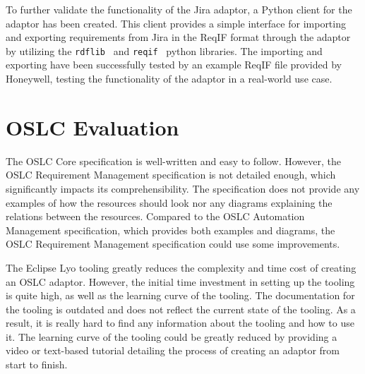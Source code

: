 To further validate the functionality of the Jira adaptor, a Python client for the adaptor has been created. This client provides a simple interface for importing and exporting requirements from Jira in the ReqIF format through the adaptor by utilizing the \texttt{rdflib} \cite{python_rdflib} and \texttt{reqif} \cite{python_reqif} python libraries. The importing and exporting have been successfully tested by an example ReqIF file provided by Honeywell, testing the functionality of the adaptor in a real-world use case.

\section{OSLC Evaluation}
The OSLC Core specification is well-written and easy to follow. However, the OSLC Requirement Management specification is not detailed enough, which significantly impacts its comprehensibility. The specification does not provide any examples of how the resources should look nor any diagrams explaining the relations between the resources. Compared to the OSLC Automation Management specification, which provides both examples and diagrams, the OSLC Requirement Management specification could use some improvements.

The Eclipse Lyo tooling greatly reduces the complexity and time cost of creating an OSLC adaptor. However, the initial time investment in setting up the tooling is quite high, as well as the learning curve of the tooling. The documentation for the tooling is outdated and does not reflect the current state of the tooling. As a result, it is really hard to find any information about the tooling and how to use it. The learning curve of the tooling could be greatly reduced by providing a video or text-based tutorial detailing the process of creating an adaptor from start to finish.

